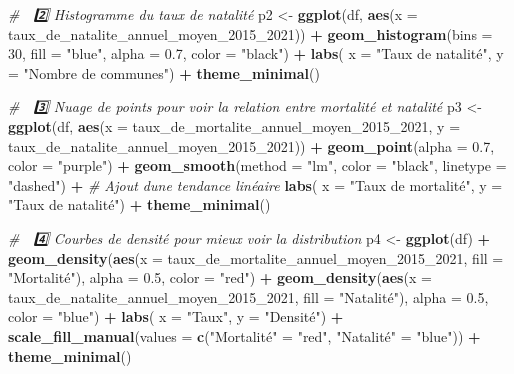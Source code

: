 \documentclass[
]{article}
\newenvironment{Shaded}{\begin{snugshade}}{\end{snugshade}}
\newcommand{\AttributeTok}[1]{\textcolor[rgb]{0.13,0.29,0.53}{#1}}
\newcommand{\CommentTok}[1]{\textcolor[rgb]{0.56,0.35,0.01}{\textit{#1}}}
\newcommand{\DecValTok}[1]{\textcolor[rgb]{0.00,0.00,0.81}{#1}}
\newcommand{\FloatTok}[1]{\textcolor[rgb]{0.00,0.00,0.81}{#1}}
\newcommand{\FunctionTok}[1]{\textcolor[rgb]{0.13,0.29,0.53}{\textbf{#1}}}
\newcommand{\NormalTok}[1]{#1}
\newcommand{\OtherTok}[1]{\textcolor[rgb]{0.56,0.35,0.01}{#1}}
\newcommand{\SpecialCharTok}[1]{\textcolor[rgb]{0.81,0.36,0.00}{\textbf{#1}}}
\newcommand{\StringTok}[1]{\textcolor[rgb]{0.31,0.60,0.02}{#1}}
\begin{document}
\begin{Shaded}
\begin{Highlighting}[]
\CommentTok{\# 📌 2️⃣ Histogramme du taux de natalité}
\NormalTok{p2 }\OtherTok{\textless{}{-}} \FunctionTok{ggplot}\NormalTok{(df, }\FunctionTok{aes}\NormalTok{(}\AttributeTok{x =}\NormalTok{ taux\_de\_natalite\_annuel\_moyen\_2015\_2021)) }\SpecialCharTok{+}
  \FunctionTok{geom\_histogram}\NormalTok{(}\AttributeTok{bins =} \DecValTok{30}\NormalTok{, }\AttributeTok{fill =} \StringTok{"blue"}\NormalTok{, }\AttributeTok{alpha =} \FloatTok{0.7}\NormalTok{, }\AttributeTok{color =} \StringTok{"black"}\NormalTok{) }\SpecialCharTok{+}
  \FunctionTok{labs}\NormalTok{(}
       \AttributeTok{x =} \StringTok{"Taux de natalité"}\NormalTok{, }
       \AttributeTok{y =} \StringTok{"Nombre de communes"}\NormalTok{) }\SpecialCharTok{+}
  \FunctionTok{theme\_minimal}\NormalTok{()}

\CommentTok{\# 📌 3️⃣ Nuage de points pour voir la relation entre mortalité et natalité}
\NormalTok{p3 }\OtherTok{\textless{}{-}} \FunctionTok{ggplot}\NormalTok{(df, }\FunctionTok{aes}\NormalTok{(}\AttributeTok{x =}\NormalTok{ taux\_de\_mortalite\_annuel\_moyen\_2015\_2021, }
                     \AttributeTok{y =}\NormalTok{ taux\_de\_natalite\_annuel\_moyen\_2015\_2021)) }\SpecialCharTok{+}
  \FunctionTok{geom\_point}\NormalTok{(}\AttributeTok{alpha =} \FloatTok{0.7}\NormalTok{, }\AttributeTok{color =} \StringTok{"purple"}\NormalTok{) }\SpecialCharTok{+}
  \FunctionTok{geom\_smooth}\NormalTok{(}\AttributeTok{method =} \StringTok{"lm"}\NormalTok{, }\AttributeTok{color =} \StringTok{"black"}\NormalTok{, }\AttributeTok{linetype =} \StringTok{"dashed"}\NormalTok{) }\SpecialCharTok{+}  \CommentTok{\# Ajout d\textquotesingle{}une tendance linéaire}
  \FunctionTok{labs}\NormalTok{(}
       \AttributeTok{x =} \StringTok{"Taux de mortalité"}\NormalTok{,}
       \AttributeTok{y =} \StringTok{"Taux de natalité"}\NormalTok{) }\SpecialCharTok{+}
  \FunctionTok{theme\_minimal}\NormalTok{()}

\CommentTok{\# 📌 4️⃣ Courbes de densité pour mieux voir la distribution}
\NormalTok{p4 }\OtherTok{\textless{}{-}} \FunctionTok{ggplot}\NormalTok{(df) }\SpecialCharTok{+}
  \FunctionTok{geom\_density}\NormalTok{(}\FunctionTok{aes}\NormalTok{(}\AttributeTok{x =}\NormalTok{ taux\_de\_mortalite\_annuel\_moyen\_2015\_2021, }\AttributeTok{fill =} \StringTok{"Mortalité"}\NormalTok{), }\AttributeTok{alpha =} \FloatTok{0.5}\NormalTok{, }\AttributeTok{color =} \StringTok{"red"}\NormalTok{) }\SpecialCharTok{+}
  \FunctionTok{geom\_density}\NormalTok{(}\FunctionTok{aes}\NormalTok{(}\AttributeTok{x =}\NormalTok{ taux\_de\_natalite\_annuel\_moyen\_2015\_2021, }\AttributeTok{fill =} \StringTok{"Natalité"}\NormalTok{), }\AttributeTok{alpha =} \FloatTok{0.5}\NormalTok{, }\AttributeTok{color =} \StringTok{"blue"}\NormalTok{) }\SpecialCharTok{+}
  \FunctionTok{labs}\NormalTok{(}
       \AttributeTok{x =} \StringTok{"Taux"}\NormalTok{,}
       \AttributeTok{y =} \StringTok{"Densité"}\NormalTok{) }\SpecialCharTok{+}
  \FunctionTok{scale\_fill\_manual}\NormalTok{(}\AttributeTok{values =} \FunctionTok{c}\NormalTok{(}\StringTok{"Mortalité"} \OtherTok{=} \StringTok{"red"}\NormalTok{, }\StringTok{"Natalité"} \OtherTok{=} \StringTok{"blue"}\NormalTok{)) }\SpecialCharTok{+}
  \FunctionTok{theme\_minimal}\NormalTok{()}


\end{Highlighting}
\end{Shaded}
\end{document}
